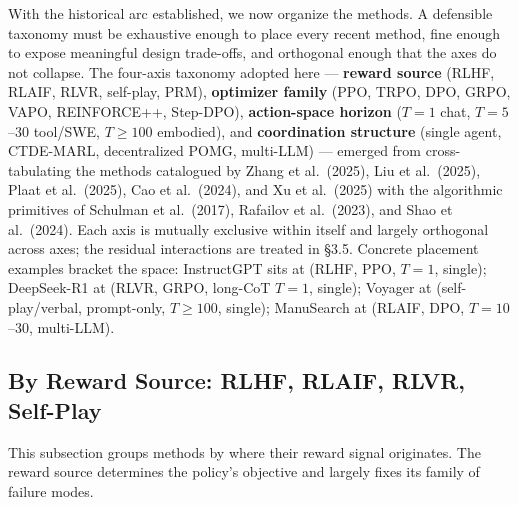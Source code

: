 With the historical arc established, we now organize the methods. A defensible taxonomy must be exhaustive enough to place every recent method, fine enough to expose meaningful design trade-offs, and orthogonal enough that the axes do not collapse. The four-axis taxonomy adopted here --- \textbf{reward source} (RLHF, RLAIF, RLVR, self-play, PRM), \textbf{optimizer family} (PPO, TRPO, DPO, GRPO, VAPO, REINFORCE++, Step-DPO), \textbf{action-space horizon} (\(T=1\) chat, \(T=5\)--30 tool/SWE, \(T \geq 100\) embodied), and \textbf{coordination structure} (single agent, CTDE-MARL, decentralized POMG, multi-LLM) --- emerged from cross-tabulating the methods catalogued by Zhang et al.~(2025), Liu et al.~(2025), Plaat et al.~(2025), Cao et al.~(2024), and Xu et al.~(2025) with the algorithmic primitives of Schulman et al.~(2017), Rafailov et al.~(2023), and Shao et al.~(2024). Each axis is mutually exclusive within itself and largely orthogonal across axes; the residual interactions are treated in §3.5. Concrete placement examples bracket the space: InstructGPT sits at (RLHF, PPO, \(T=1\), single); DeepSeek-R1 at (RLVR, GRPO, long-CoT \(T=1\), single); Voyager at (self-play/verbal, prompt-only, \(T \geq 100\), single); ManuSearch at (RLAIF, DPO, \(T=10\)--30, multi-LLM).

\subsection{By Reward Source: RLHF, RLAIF, RLVR, Self-Play}\label{by-reward-source-rlhf-rlaif-rlvr-self-play}

This subsection groups methods by where their reward signal originates. The reward source determines the policy's objective and largely fixes its family of failure modes.

